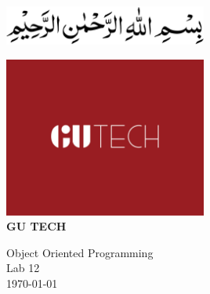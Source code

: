 \documentclass[12pt]{article}
\begin{document}
\begin{titlepage}
    \centering

    \vspace*{-8em}
    \includegraphics[width=0.5\textwidth]{Bismillah.png}%
    \vspace*{5em}

    
    \vspace*{1cm}

     \includegraphics[width=0.5\textwidth]{GU Tech 1685x1330.png}\\[2cm]

    \MakeUppercase{\Huge \textbf{GU TECH}}\\[1.5ex]
    
    \vspace*{1cm}
    
    \Huge Object Oriented Programming \\[1.5ex]
    \LARGE Lab 12 \\[2cm]


    {\Large \today}\\[1cm]
    
\end{titlepage}

\newpage


\end{document}
